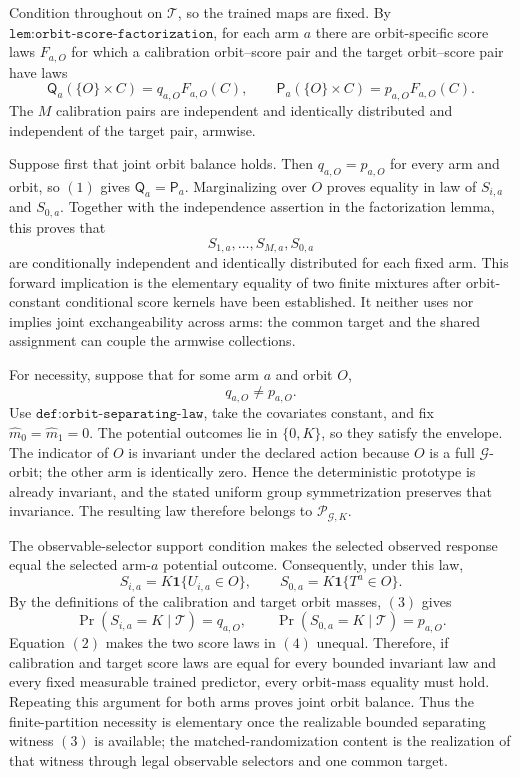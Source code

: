 Condition throughout on \(\mathcal T\), so the trained maps are fixed. By \(\texttt{lem:orbit-score-factorization}\), for each arm \(a\) there are orbit-specific score laws \(F_{a,O}\) for which a calibration orbit--score pair and the target orbit--score pair have laws
\[
\mathsf Q_a(\{O\}\times C)=q_{a,O}F_{a,O}(C),\qquad \mathsf P_a(\{O\}\times C)=p_{a,O}F_{a,O}(C).\tag{1}
\]
The \(M\) calibration pairs are independent and identically distributed and independent of the target pair, armwise.

Suppose first that joint orbit balance holds. Then \(q_{a,O}=p_{a,O}\) for every arm and orbit, so \((1)\) gives \(\mathsf Q_a=\mathsf P_a\). Marginalizing over \(O\) proves equality in law of \(S_{i,a}\) and \(S_{0,a}\). Together with the independence assertion in the factorization lemma, this proves that
\[
S_{1,a},\ldots,S_{M,a},S_{0,a}
\]
are conditionally independent and identically distributed for each fixed arm. This forward implication is the elementary equality of two finite mixtures after orbit-constant conditional score kernels have been established. It neither uses nor implies joint exchangeability across arms: the common target and the shared assignment can couple the armwise collections.

For necessity, suppose that for some arm \(a\) and orbit \(O\),
\[
q_{a,O}\ne p_{a,O}.\tag{2}
\]
Use \(\texttt{def:orbit-separating-law}\), take the covariates constant, and fix \(\widehat m_0=\widehat m_1=0\). The potential outcomes lie in \(\{0,K\}\), so they satisfy the envelope. The indicator of \(O\) is invariant under the declared action because \(O\) is a full \(\mathcal G\)-orbit; the other arm is identically zero. Hence the deterministic prototype is already invariant, and the stated uniform group symmetrization preserves that invariance. The resulting law therefore belongs to \(\mathcal P_{\mathcal G,K}\).

The observable-selector support condition makes the selected observed response equal the selected arm-\(a\) potential outcome. Consequently, under this law,
\[
S_{i,a}=K\mathbf 1\{U_{i,a}\in O\},\qquad S_{0,a}=K\mathbf 1\{T^a\in O\}.\tag{3}
\]
By the definitions of the calibration and target orbit masses, \((3)\) gives
\[
\Pr(S_{i,a}=K\mid\mathcal T)=q_{a,O},\qquad \Pr(S_{0,a}=K\mid\mathcal T)=p_{a,O}.\tag{4}
\]
Equation \((2)\) makes the two score laws in \((4)\) unequal. Therefore, if calibration and target score laws are equal for every bounded invariant law and every fixed measurable trained predictor, every orbit-mass equality must hold. Repeating this argument for both arms proves joint orbit balance. Thus the finite-partition necessity is elementary once the realizable bounded separating witness \((3)\) is available; the matched-randomization content is the realization of that witness through legal observable selectors and one common target.